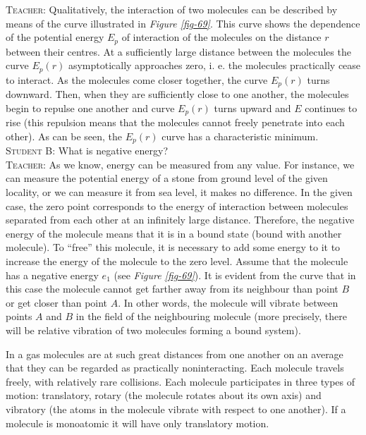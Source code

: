 \documentclass[a4paper,sfsidenotes]{tufte-book}
\begin{document}
\textsc{Teacher:} Qualitatively, the interaction of two molecules can be described by means of the curve illustrated in \emph{Figure \ref{fig-69}}. This curve shows the dependence of the potential energy $E_{p}$ of interaction of the molecules on the distance $r$ between their centres. At a sufficiently large distance between the molecules the curve $E_{p}(r)$ asymptotically approaches zero, i. e. the molecules practically cease to interact. As the molecules come closer together, the curve $E_{p}(r)$ turns downward. Then, when they are sufficiently close to one another, the molecules begin to repulse one another and curve $E_{p}(r)$ turns upward and $E$ continues to rise (this repulsion means that the molecules cannot freely penetrate into each other). As can be seen, the $E_{p}(r)$ curve has a characteristic minimum.
\\
\textsc{Student B:} What is negative energy?
\\
\textsc{Teacher:} As we know, energy can be measured from any value. For instance, we can measure the potential energy of a stone from ground level of the given locality, or we can measure it from sea level, it makes no difference. In the given case, the zero point corresponds to the energy of interaction between molecules separated from each other at an infinitely large distance. Therefore, the negative energy of the molecule means that it is in a bound state (bound with another molecule). To ``free'' this molecule, it is necessary to add some energy to it to increase the energy of the molecule to the zero level. Assume that the molecule has a negative energy $e_{1}$ (see \emph{Figure \ref{fig-69}}). It is evident from the curve that in this case the molecule cannot get farther away from its neighbour than point $B$ or get closer than point $A$. In other words, the molecule will vibrate between points $A$ and $B$ in the field of the neighbouring molecule (more precisely, there will be relative vibration of two molecules forming a bound system).

In a gas molecules are at such great distances from one another on an average that they can be regarded as practically noninteracting. Each molecule travels freely, with relatively rare collisions. Each molecule participates in three types of motion: translatory, rotary (the molecule rotates about its own axis) and vibratory (the atoms in the molecule vibrate with respect to one another). If a molecule is monoatomic it will have only translatory motion.
\end{document}
